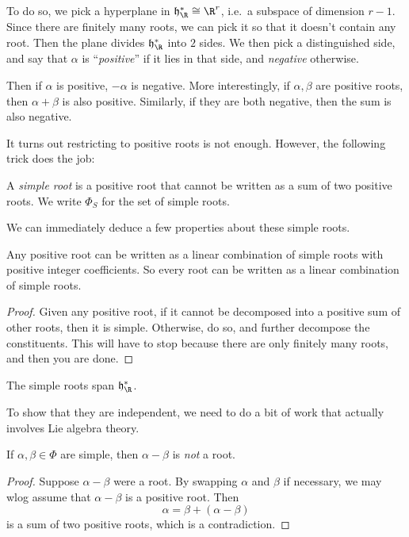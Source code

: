 \documentclass[a4paper]{article}
\begin{document}
To do so, we pick a hyperplane in $\mathfrak{h}_\R^* \cong \R^r$, i.e.\ a subspace of dimension $r - 1$. Since there are finitely many roots, we can pick it so that it doesn't contain any root. Then the plane divides $\mathfrak{h}_\R^*$ into $2$ sides. We then pick a distinguished side, and say that $\alpha$ is ``\emph{positive}'' if it lies in that side, and \emph{negative} otherwise.

Then if $\alpha$ is positive, $-\alpha $ is negative. More interestingly, if $\alpha, \beta$ are positive roots, then $\alpha + \beta$ is also positive. Similarly, if they are both negative, then the sum is also negative.

It turns out restricting to positive roots is not enough. However, the following trick does the job:

\begin{defi}
  A \emph{simple root} is a positive root that cannot be written as a sum of two positive roots. We write $\Phi_S$ for the set of simple roots.
\end{defi}

We can immediately deduce a few properties about these simple roots.
\begin{prop}
  Any positive root can be written as a linear combination of simple roots with positive integer coefficients. So every root can be written as a linear combination of simple roots.
\end{prop}

\begin{proof}
  Given any positive root, if it cannot be decomposed into a positive sum of other roots, then it is simple. Otherwise, do so, and further decompose the constituents. This will have to stop because there are only finitely many roots, and then you are done.
\end{proof}

\begin{cor}
  The simple roots span $\mathfrak{h}^*_{\R}$.
\end{cor}

To show that they are independent, we need to do a bit of work that actually involves Lie algebra theory.
\begin{prop}
  If $\alpha, \beta \in \Phi$ are simple, then $\alpha - \beta$ is \emph{not} a root.
\end{prop}

\begin{proof}
  Suppose $\alpha - \beta$ were a root. By swapping $\alpha$ and $\beta$ if necessary, we may wlog assume that $\alpha - \beta$ is a positive root. Then
  \[
    \alpha = \beta + (\alpha - \beta)
  \]
  is a sum of two positive roots, which is a contradiction.
\end{proof}
\end{document}
